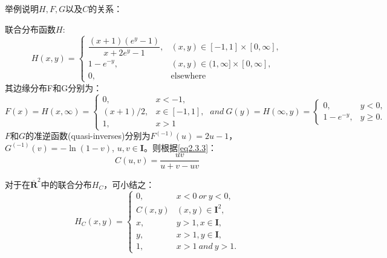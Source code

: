 举例说明$H,F,G$以及$C$的关系：
\begin{example}
    联合分布函数$H$:
    \begin{equation*}
        H(x,y) = 
            \begin{cases}
                \dfrac{(x+1)(e^y-1)}{x+2e^y-1}, & (x,y) \in [-1,1]\times [0,\infty], \\
            1-e^{-y},   & (x,y) \in (1,\infty] \times [0,\infty], \\
            0, & \mbox{elsewhere}
            \end{cases}
    \end{equation*}
    其边缘分布F和G分别为：
    \begin{equation*}
        F(x) = H(x,\infty)=
        \begin{cases}
            0, &x<-1,\\
            (x+1)/2, &x\in[-1,1], \\
            1, &x>1
        \end{cases}
        \ and \ 
        G(y) = H(\infty,y) = 
        \begin{cases}
            0, &y<0, \\
            1-e^{-y}, &y\geq 0.
        \end{cases}
    \end{equation*}
    $F$和$G$的准逆函数(quasi-inverses)分别为$F^{(-1)}(u) = 2u-1$，$G^{(-1)}(v) = -\ln (1-v)$, $u,v \in \mathbf{I}$。则根据\cref{eq2.3.3}：
    \begin{equation}
        C(u,v) = \dfrac{uv}{u+v-uv}
        \label{eq2.3.4}
    \end{equation}
    \label{example-copula}
\end{example}
对于在$\overline{\mathbf{R}}^2$中的联合分布$H_C$，可小结之：
\begin{equation}
    H_C(x,y) = 
    \begin{cases}
        0, &x<0 \ or \ y<0,\\
        C(x,y) &(x,y) \in \mathbf{I}^2, \\
        x, &y>1, x \in \mathbf{I}, \\
        y, &x>1, y \in \mathbf{I}, \\
        1, &x>1 \ and \ y>1.
    \end{cases}
    \label{eq-conclusion}
\end{equation}

